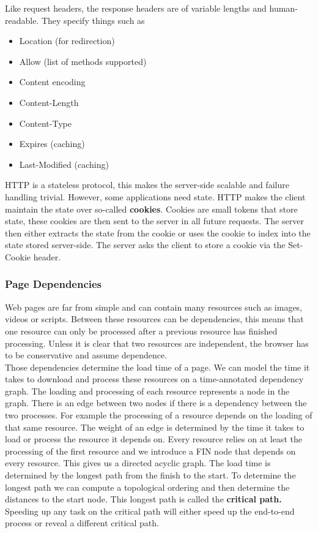 Like request headers, the response headers are of variable lengths and human-readable. They specify things such as
\begin{itemize}
\item Location (for redirection)
\item Allow (list of methods supported)
\item Content encoding
\item Content-Length
\item Content-Type
\item Expires (caching)
\item Last-Modified (caching)
\end{itemize}
HTTP is a stateless protocol, this makes the server-side scalable and failure handling trivial. However, some applications need state. HTTP makes the client maintain the state over so-called \textbf{cookies}. Cookies are small tokens that store state, these cookies are then sent to the server in all future requests. The server then either extracts the state from the cookie or uses the cookie to index into the state stored server-side. The server asks the client to store a cookie via the Set-Cookie header.

\subsubsection{Page Dependencies}
Web pages are far from simple and can contain many resources such as images, videos or scripts. Between these resources can be dependencies, this means that one resource can only be processed after a previous resource has finished processing. Unless it is clear that two resources are independent, the browser has to be conservative and assume dependence. \\
Those dependencies determine the load time of a page. We can model the time it takes to download and process these resources on a time-annotated dependency graph. The loading and processing of each resource represents a node in the graph. There is an edge between two nodes if there is a dependency between the two processes. For example the processing of a resource depends on the loading of that same resource. The weight of an edge is determined by the time it takes to load or process the resource it depends on. Every resource relies on at least the processing of the first resource and we introduce a FIN node that depends on every resource. This gives us a directed acyclic graph. The load time is determined by the longest path from the finish to the start. To determine the longest path we can compute a topological ordering and then determine the distances to the start node. This longest path is called the \textbf{critical path.} Speeding up any task on the critical path will either speed up the end-to-end process or reveal a different critical path.\vspace{.3cm}\\

